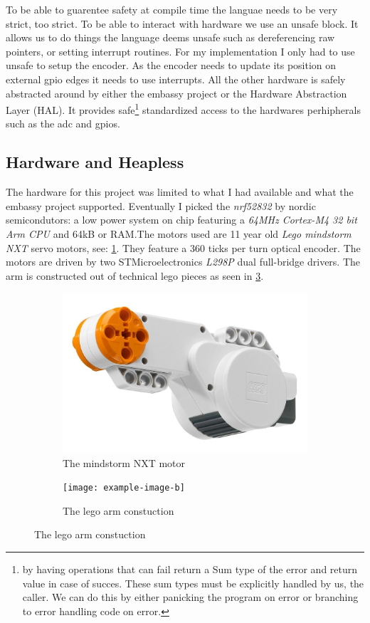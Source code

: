 \documentclass[lang=en, hanging-titles=true]{skrapport}
\begin{document}
To be able to guarentee safety at compile time the languae needs to be very strict, too strict. To be able to interact with hardware we use an unsafe block. It allows us to do things the language deems unsafe such as dereferencing raw pointers, or setting interrupt routines. For my implementation I only had to use unsafe to setup the encoder. As the encoder needs to update its position on external gpio edges it needs to use interrupts. All the other hardware is safely abstracted around by either the embassy project\cite{embassy} or the Hardware Abstraction Layer (\textsc{HAL}). It provides safe\footnote{by having operations that can fail return a Sum type of the error and return value in case of succes. These sum types must be explicitly handled by us, the caller. We can do this by either panicking the program on error or branching to error handling code on error.} standardized access to the hardwares perhipherals such as the adc and gpios.

\subsection{Hardware and Heapless} \label{sec:hw}
The hardware for this project was limited to what I had available and what the embassy project supported. Eventually I picked the \textit{nrf52832} by nordic semicondutors: a low power system on chip featuring a \textit{64MHz Cortex-M4 32 bit Arm CPU} and 64kB or RAM.The motors used are 11 year old \textit{Lego mindstorm NXT} servo motors, see: \cref{fig:motor}. They feature a 360 ticks per turn optical encoder. The motors are driven by two STMicroelectronics \textit{L298P} dual full-bridge drivers. The arm is constructed out of technical lego pieces as seen in \cref{fig:arm}.
%
\begin{figure}
	\centering
	\begin{subfigure}[b]{0.5\linewidth}
		\centering
		\includegraphics[width=\linewidth]{figs/motor}
		\caption{The mindstorm NXT motor}
		\label{fig:motor}
	\end{subfigure}%
	\begin{subfigure}[b]{0.5\linewidth}
		\centering
		\texttt{[image: example-image-b]}
		\caption{The lego arm constuction}
		\label{fig:arm}
	\end{subfigure}
\end{figure}
%
\end{document}
